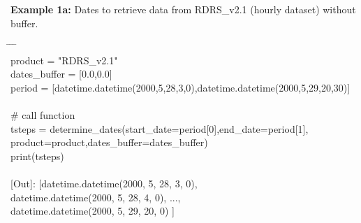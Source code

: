 \documentclass[10pt,a4paper,titlepage,parskip]{scrartcl}
\newenvironment{ttfont}{\fontfamily{\ttdefault}\selectfont}{\par}
\newcommand{\GRAU}[1]{\textcolor{ufzgray2}{#1}}
\begin{document}
\textbf{Example 1a:} Dates to retrieve data from RDRS\_v2.1 (hourly dataset) without buffer.
\begin{framed}
	\vspace*{-1.2cm}
	\begin{ttfont}
		\begin{tabbing}
			\hspace{1.5cm} \= \hspace{2.7cm} \= \hspace{4.7cm} \= \kill \\[4pt]
			product = "RDRS\_v2.1"\\
			dates\_buffer = [0.0,0.0]\\
			period = [datetime.datetime(2000,5,28,3,0),datetime.datetime(2000,5,29,20,30)]\\
			\\
			\GRAU{\# call function}\\
			tsteps = determine\_dates(start\_date=period[0],end\_date=period[1],\\
			\> \> product=product,dates\_buffer=dates\_buffer)\\
			print(tsteps)\\
			\\
			\GRAU{[Out]: [datetime.datetime(2000, 5, 28, 3, 0),}\\
			\> 	\GRAU{ datetime.datetime(2000, 5, 28, 4, 0), ..., }\\
			\> 	\GRAU{ datetime.datetime(2000, 5, 29, 20, 0) ]   }\\
		\end{tabbing}
	\end{ttfont}
\vspace*{-0.3cm}
\end{framed}
\vspace*{-0.3cm}
\end{document}
